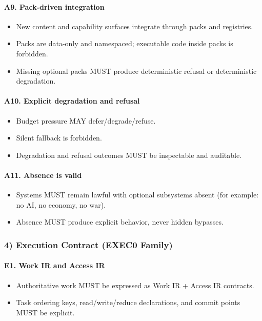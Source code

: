 \documentclass[9pt,a4paper,openany]{book}
\begin{document}
\paragraph{A9. Pack-driven integration}
\begin{itemize}
\item New content and capability surfaces integrate through packs and registries.\allowbreak{}
\item Packs are data-\allowbreak{}only and namespaced; executable code inside packs is forbidden.\allowbreak{}
\item Missing optional packs MUST produce deterministic refusal or deterministic degradation.\allowbreak{}
\end{itemize}

\paragraph{A10. Explicit degradation and refusal}
\begin{itemize}
\item Budget pressure MAY defer/\allowbreak{}degrade/\allowbreak{}refuse.\allowbreak{}
\item Silent fallback is forbidden.\allowbreak{}
\item Degradation and refusal outcomes MUST be inspectable and auditable.\allowbreak{}
\end{itemize}

\paragraph{A11. Absence is valid}
\begin{itemize}
\item Systems MUST remain lawful with optional subsystems absent (for example: no AI, no economy, no war).\allowbreak{}
\item Absence MUST produce explicit behavior, never hidden bypasses.\allowbreak{}
\end{itemize}

\subsubsection{4) Execution Contract (EXEC0 Family)}

\paragraph{E1. Work IR and Access IR}
\begin{itemize}
\item Authoritative work MUST be expressed as Work IR + Access IR contracts.\allowbreak{}
\item Task ordering keys, read/\allowbreak{}write/\allowbreak{}reduce declarations, and commit points MUST be explicit.\allowbreak{}
\end{itemize}
\end{document}
